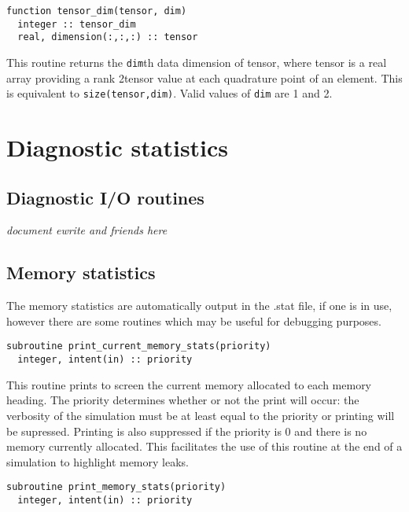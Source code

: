 \documentclass[a4paper, 11pt]{book}
\begin{document}
\begin{lstlisting}
function tensor_dim(tensor, dim)
  integer :: tensor_dim
  real, dimension(:,:,:) :: tensor
\end{lstlisting}

This routine returns the \lstinline+dim+th data dimension of tensor, where
tensor is a real array providing a rank 2tensor value at each quadrature
point of an element.  This is equivalent to \lstinline+size(tensor,dim)+.
Valid values of \lstinline+dim+ are 1 and 2.



\chapter{Diagnostic statistics}

\section{Diagnostic I/O routines}

\textit{document ewrite and friends here}

\section{Memory statistics}

The memory statistics are automatically output in the .stat file, if one is
in use, however there are some routines which may be useful for debugging
purposes.


\begin{lstlisting}
subroutine print_current_memory_stats(priority)
  integer, intent(in) :: priority
\end{lstlisting}

This routine prints to screen the current memory allocated to each memory
heading. The priority determines whether or not the print will occur: the
verbosity of the simulation must be at least equal to the priority or
printing will be supressed. Printing is also suppressed if the priority is 0
and there is no memory currently allocated. This facilitates the use of this
routine at the end of a simulation to highlight memory leaks.


\begin{lstlisting}
subroutine print_memory_stats(priority)
  integer, intent(in) :: priority
\end{lstlisting}
\end{document}
